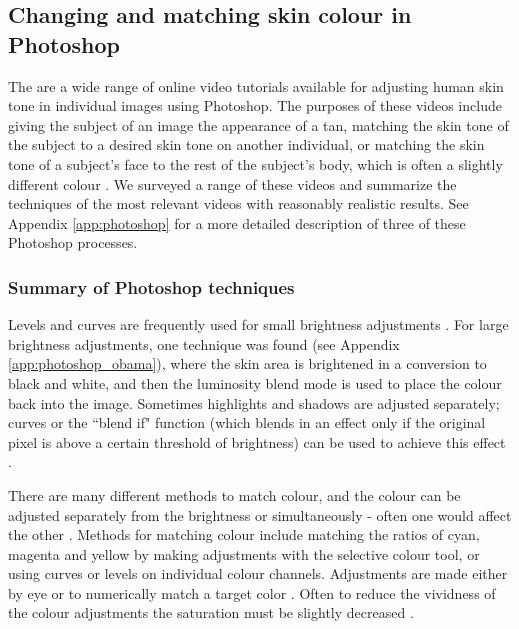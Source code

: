 \subsection{Changing and matching skin colour in Photoshop}

The are a wide range of online video tutorials available for adjusting human skin tone in individual images using Photoshop. The purposes of these videos include giving the subject of an image the appearance of a tan, matching the skin tone of the subject to a desired skin tone on another individual, or matching the skin tone of a subject's face to the rest of the subject's body, which is often a slightly different colour \cite{photoshop:tan} \cite{photoshop:match_other} \cite{photoshop:match_body}. We surveyed a range of these videos and summarize the techniques of the most relevant videos with reasonably realistic results. See Appendix \ref{app:photoshop} for a more detailed description of three of these Photoshop processes. 

\subsubsection*{Summary of Photoshop techniques}

Levels and curves are frequently used for small brightness adjustments \cite{photoshop:obama} \cite{photoshop:match_body} \cite{photoshop:match_other}. For large brightness adjustments, one technique was found (see Appendix \ref{app:photoshop_obama}), where the skin area is brightened in a conversion to black and white, and then the luminosity blend mode is used to place the colour back into the image. Sometimes highlights and shadows are adjusted separately; curves or the ``blend if" function (which blends in an effect only if the original pixel is above a certain threshold of brightness) can be used to achieve this effect \cite{photoshop:tan}.

There are many different methods to match colour, and the colour can be adjusted separately from the brightness or simultaneously - often one would affect the other \cite{photoshop:match_body} \cite{photoshop:match_other}. Methods for matching colour include matching the ratios of cyan, magenta and yellow by making adjustments with the selective colour tool, or using curves or levels on individual colour channels. Adjustments are made either by eye or to numerically match a target color \cite{photoshop:selective} \cite{photoshop:match_body} \cite{photoshop:match_other}. Often to reduce the vividness of the colour adjustments the saturation must be slightly decreased \cite{photoshop:obama} \cite{photoshop:match_body}.

